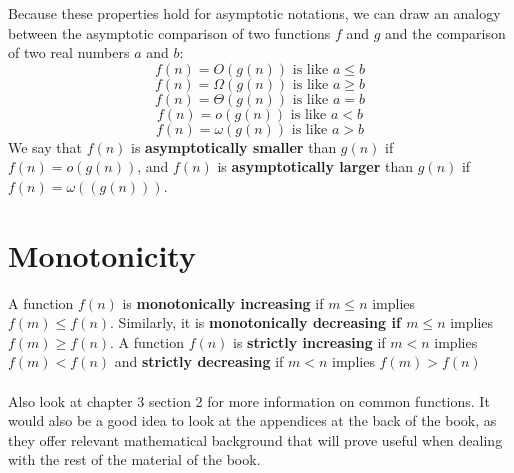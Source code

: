 \documentclass[12pt]{article}
\begin{document}
Because these properties hold for asymptotic notations, we can draw an analogy between the asymptotic comparison of two functions $f$ and $g$ and the comparison of two real numbers $a$ and $b$:
\begin{equation*}
f(n) = O{(g(n))} \text{ is like } a \leq b
\end{equation*}
\begin{equation*}
f(n) = \Omega{(g(n))} \text{ is like } a \geq b
\end{equation*}
\begin{equation*}
f(n) = \Theta{(g(n))} \text{ is like } a = b
\end{equation*}
\begin{equation*}
f(n) = o{(g(n))} \text{ is like } a < b
\end{equation*}
\begin{equation*}
f(n) = \omega{(g(n))} \text{ is like } a > b
\end{equation*}
We say that $f(n)$ is \textbf{asymptotically smaller} than $g(n)$ if $f(n) = o(g(n))$, and $f(n)$ is \textbf{asymptotically larger} than $g(n)$ if $f(n) = \omega{((g(n)))}$.

\newpage
\section*{Monotonicity}
A function $f(n)$ is \textbf{monotonically increasing} if $m \leq n$ implies $f(m) \leq f(n)$. Similarly, it is \textbf{monotonically decreasing if $m \leq n$} implies $f(m) \geq f(n)$. A function $f(n)$ is \textbf{strictly increasing} if $m < n$ implies $f(m) < f(n)$ and \textbf{strictly decreasing} if $m < n$ implies $f(m) > f(n)$
\\ \\
Also look at chapter 3 section 2 for more information on common functions. It would also be a good idea to look at the appendices at the back of the book, as they offer relevant mathematical background that will prove useful when dealing with the rest of the material of the book.
\end{document}
